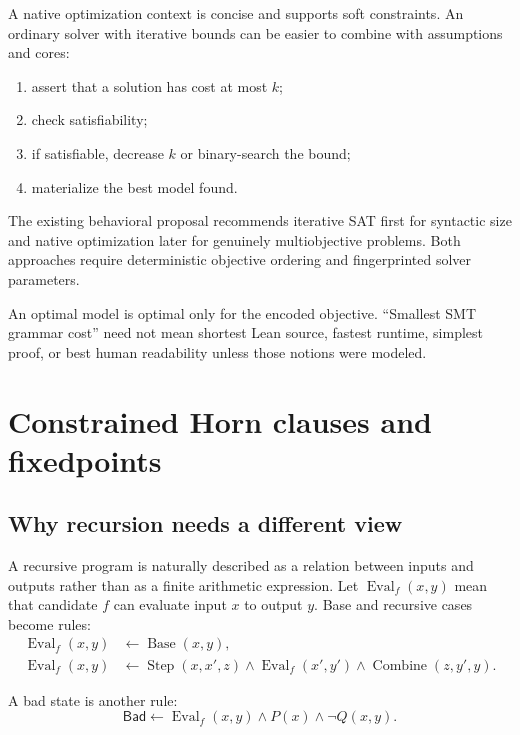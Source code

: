 \documentclass[10pt,letterpaper,oneside]{report}
\newcommand{\bad}{\mathsf{Bad}}
\begin{document}
A native optimization context is concise and supports soft constraints. An ordinary solver with iterative bounds can be easier to combine with assumptions and cores:

\begin{enumerate}
\item assert that a solution has cost at most $k$;
\item check satisfiability;
\item if satisfiable, decrease $k$ or binary-search the bound;
\item materialize the best model found.
\end{enumerate}

The existing behavioral proposal recommends iterative SAT first for syntactic size and native optimization later for genuinely multiobjective problems. Both approaches require deterministic objective ordering and fingerprinted solver parameters.

\begin{pitfall}
An optimal model is optimal only for the encoded objective. ``Smallest SMT grammar cost'' need not mean shortest Lean source, fastest runtime, simplest proof, or best human readability unless those notions were modeled.
\end{pitfall}

\chapter{Constrained Horn clauses and fixedpoints}
\label{chap:chc}

\section{Why recursion needs a different view}

A recursive program is naturally described as a relation between inputs and outputs rather than as a finite arithmetic expression. Let $\operatorname{Eval}_f(x,y)$ mean that candidate $f$ can evaluate input $x$ to output $y$. Base and recursive cases become rules:
\begin{align*}
\operatorname{Eval}_f(x,y) &\leftarrow \operatorname{Base}(x,y),\\
\operatorname{Eval}_f(x,y) &\leftarrow
  \operatorname{Step}(x,x',z)\land
  \operatorname{Eval}_f(x',y')\land
  \operatorname{Combine}(z,y',y).
\end{align*}

A bad state is another rule:
\[
  \bad\leftarrow \operatorname{Eval}_f(x,y)\land P(x)\land\neg Q(x,y).
\]
\end{document}
